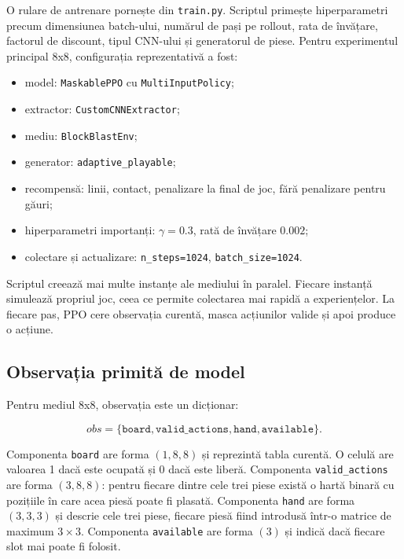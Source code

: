 \documentclass[12pt,a4paper]{article}
\begin{document}
O rulare de antrenare pornește din \texttt{train.py}. Scriptul primește hiperparametri precum dimensiunea batch-ului, numărul de pași pe rollout, rata de învățare, factorul de discount, tipul CNN-ului și generatorul de piese. Pentru experimentul principal 8x8, configurația reprezentativă a fost:

\begin{itemize}
    \item model: \texttt{MaskablePPO} cu \texttt{MultiInputPolicy};
    \item extractor: \texttt{CustomCNNExtractor};
    \item mediu: \texttt{BlockBlastEnv};
    \item generator: \texttt{adaptive\_playable};
    \item recompensă: linii, contact, penalizare la final de joc, fără penalizare pentru găuri;
    \item hiperparametri importanți: $\gamma=0.3$, rată de învățare $0.002$;
    \item colectare și actualizare: \texttt{n\_steps=1024}, \texttt{batch\_size=1024}.
\end{itemize}

Scriptul creează mai multe instanțe ale mediului în paralel. Fiecare instanță simulează propriul joc, ceea ce permite colectarea mai rapidă a experiențelor. La fiecare pas, PPO cere observația curentă, masca acțiunilor valide și apoi produce o acțiune.

\subsection{Observația primită de model}

Pentru mediul 8x8, observația este un dicționar:

\begin{equation}
    obs = \{\texttt{board}, \texttt{valid\_actions}, \texttt{hand}, \texttt{available}\}.
\end{equation}

Componenta \texttt{board} are forma $(1,8,8)$ și reprezintă tabla curentă. O celulă are valoarea 1 dacă este ocupată și 0 dacă este liberă. Componenta \texttt{valid\_actions} are forma $(3,8,8)$: pentru fiecare dintre cele trei piese există o hartă binară cu pozițiile în care acea piesă poate fi plasată. Componenta \texttt{hand} are forma $(3,3,3)$ și descrie cele trei piese, fiecare piesă fiind introdusă într-o matrice de maximum $3 \times 3$. Componenta \texttt{available} are forma $(3)$ și indică dacă fiecare slot mai poate fi folosit.
\end{document}
